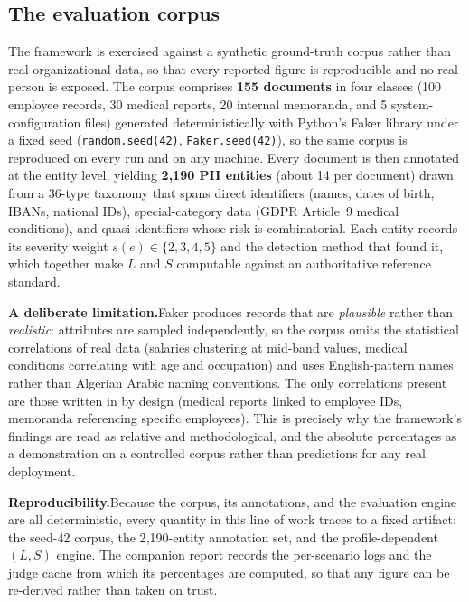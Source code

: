 \documentclass[12pt,a4paper]{report}
\begin{document}
\subsection{The evaluation corpus}
\label{sec:intro-corpus}

The framework is exercised against a synthetic ground-truth corpus rather than real organizational
data, so that every reported figure is reproducible and no real person is exposed. The corpus
comprises \textbf{155 documents} in four classes (100 employee records, 30 medical reports, 20
internal memoranda, and 5 system-configuration files) generated deterministically with Python's
Faker library under a fixed seed (\texttt{random.seed(42)}, \texttt{Faker.seed(42)}), so the same
corpus is reproduced on every run and on any machine. Every document is then annotated at the entity
level, yielding \textbf{2{,}190 PII entities} (about 14 per document) drawn from a 36-type taxonomy
that spans direct identifiers (names, dates of birth, IBANs, national IDs), special-category data
(GDPR Article~9 medical conditions), and quasi-identifiers whose risk is combinatorial. Each entity
records its severity weight $s(e)\in\{2,3,4,5\}$ and the detection method that found it, which
together make $L$ and $S$ computable against an authoritative reference standard.

\textbf{A deliberate limitation.}\quad Faker produces records that are \emph{plausible} rather than
\emph{realistic}: attributes are sampled independently, so the corpus omits the statistical
correlations of real data (salaries clustering at mid-band values, medical conditions correlating with
age and occupation) and uses English-pattern names rather than Algerian Arabic naming conventions. The
only correlations present are those written in by design (medical reports linked to employee IDs,
memoranda referencing specific employees). This is precisely why the framework's findings are read as
relative and methodological, and the absolute percentages as a demonstration on a controlled corpus
rather than predictions for any real deployment.

\textbf{Reproducibility.}\quad Because the corpus, its annotations, and the evaluation engine are all
deterministic, every quantity in this line of work traces to a fixed artifact: the seed-42 corpus, the
2{,}190-entity annotation set, and the profile-dependent $(L,S)$ engine. The companion report records
the per-scenario logs and the judge cache from which its percentages are computed, so that any figure
can be re-derived rather than taken on trust.
\end{document}
